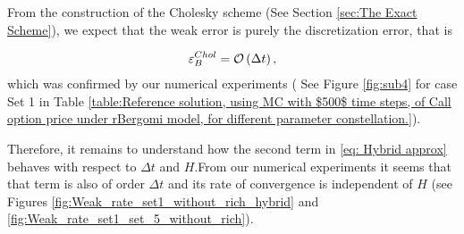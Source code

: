 From the construction of the Cholesky scheme (See Section \ref{sec:The Exact Scheme}), we expect that the weak error is purely the discretization error, that is

\begin{align*}
\varepsilon_{B}^{Chol}={\mathcal{O}}\left(\Delta t\right),
\end{align*}
which was confirmed by our numerical experiments ( See Figure \ref{fig:sub4} for case Set 1  in Table \ref{table:Reference solution, using MC with $500$ time steps, of Call option price under rBergomi model, for different parameter constellation.}). 

Therefore, it remains to understand how the second term in \ref{eq: Hybrid approx} behaves with respect to $\Delta t $ and $H$.From our numerical experiments it seems that that term is also of order $\Delta t$  and its rate of convergence is independent of $H$ (see Figures \ref{fig:Weak_rate_set1_without_rich_hybrid} and \ref{fig:Weak_rate_set1_set_5_without_rich}).